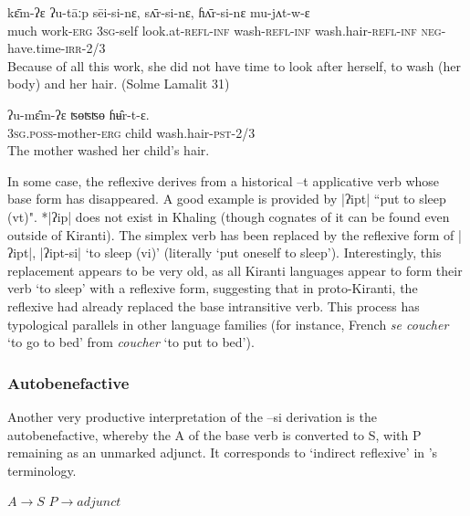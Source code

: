\documentclass[twoside,a4paper,11pt]{article}
\newcommand{\ipa}[1]{{\phon#1}}
\begin{document}
\begin{exe}
\ex \label{ex:sursi}
\gll \ipa{gʰole}  	\ipa{kɛ̄m-ʔɛ}  	\ipa{ʔu-tāːp}  	\ipa{sēi-si-nɛ,}  	\ipa{sʌ̄r-si-nɛ,}  	\ipa{ɦʌ̄r-si-nɛ}  	\ipa{mu-jʌt-w-ɛ}  \\
much work-\textsc{erg} \textsc{3sg}-self  look.at\textsc{-refl-inf} wash\textsc{-refl-inf} wash.hair\textsc{-refl-inf} \textsc{neg}-have.time-\textsc{irr}-2/3 \\
\glt Because of all this work, she did not have time to look after herself, to wash (her body) and her hair. (Solme Lamalit 31)
\end{exe}

\begin{exe}
\ex \label{ex:sur}
\gll
 \ipa{ʔu-mɛ̂m-ʔɛ}  	\ipa{ʦɵʦʦɵ}  	\ipa{ɦʉ̂r-t-ɛ.}  \\
\textsc{3sg.poss}-mother-\textsc{erg} child wash.hair-\textsc{pst}-2/3 \\
\glt The mother washed her child's hair.
\end{exe}
 
 In some case, the reflexive derives from a historical \ipa{--t} applicative verb whose base form has disappeared. A good example is provided by |ʔipt| ``put to sleep (vt)".  *|ʔip| does not exist in Khaling (though cognates of it can be found even outside of Kiranti). The simplex verb has been replaced by the reflexive form of |ʔipt|, |ʔipt-si| `to sleep (vi)' (literally `put oneself to sleep'). Interestingly, this replacement appears to be very old, as all Kiranti languages appear to form their verb `to sleep' with a reflexive form, suggesting that in proto-Kiranti,  the reflexive had already replaced the base intransitive verb. This process has typological parallels in other language families (for instance, French \textit{se coucher} `to go to bed' from \textit{coucher} `to put to bed').
 
\subsubsection{Autobenefactive}

Another very productive interpretation of the  \ipa{--si} derivation is the autobenefactive, whereby the A of the base verb is converted to S, with  P remaining as an unmarked adjunct.   It corresponds to  `indirect reflexive' in \citet{kemmer93middle}'s terminology.
 
\begin{exe}
\ex \label{ex:autoben}
\glt $A  \rightarrow S$
\glt $P  \rightarrow adjunct$
\end{exe}
 
\end{document}
